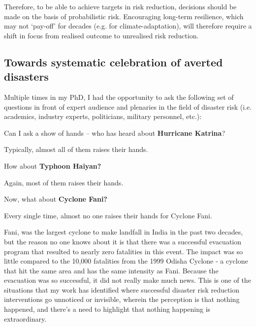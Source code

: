 Therefore, to be able to achieve targets in risk reduction, decisions should be made on the basis of probabilistic risk. Encouraging long-term resilience, which may not `pay-off' for decades (e.g. for climate-adaptation), will therefore require a shift in focus from realised outcome to unrealised risk reduction.

\subsection{Towards systematic celebration of averted disasters}

Multiple times in my PhD, I had the opportunity to ask the following set of questions in front of expert audience and plenaries in the field of disaster risk (i.e. academics, industry experts, politicians, military personnel, etc.):

\begin{center} \begin{blockquote}
Can I ask a show of hands -- who has heard about \textbf{Hurricane Katrina}?
\end{blockquote} \end{center}
Typically, almost all of them raises their hands.
\begin{center} \begin{blockquote}
How about \textbf{Typhoon Haiyan?}
\end{blockquote} \end{center}
Again, most of them raises their hands.
\begin{center} \begin{blockquote}
Now, what about \textbf{Cyclone Fani?}
\end{blockquote} \end{center}
Every single time, almost no one raises their hands for Cyclone Fani.

Fani, was the largest cyclone to make landfall in India in the past two decades, but the reason no one knows about it is that there was a successful evacuation program that resulted to nearly zero fatalities in this event. The impact was so little compared to the 10,000 fatalities from the 1999 Odisha Cyclone - a cyclone that hit the same area and has the same intensity as Fani. Because the evacuation was so successful, it did not really make much news. This is one of the situations that my work has identified where successful disaster risk reduction interventions go unnoticed or invisible, wherein the perception is that nothing happened, and there’s a need to highlight that nothing happening is extraordinary. 

